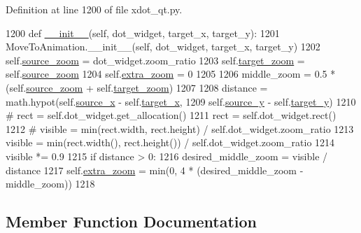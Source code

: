 Definition at line 1200 of file xdot\+\_\+qt.\+py.


\begin{DoxyCode}
1200     \textcolor{keyword}{def }\hyperlink{classsmacc__viewer_1_1xdot_1_1xdot__qt_1_1ZoomToAnimation_a29cad6d4a0c70d2abe0f7b8d5db36249}{\_\_init\_\_}(self, dot\_widget, target\_x, target\_y):
1201         MoveToAnimation.\_\_init\_\_(self, dot\_widget, target\_x, target\_y)
1202         self.\hyperlink{classsmacc__viewer_1_1xdot_1_1xdot__qt_1_1ZoomToAnimation_aedf5392aa82941dcec7f70af9c3a0fcc}{source\_zoom} = dot\_widget.zoom\_ratio
1203         self.\hyperlink{classsmacc__viewer_1_1xdot_1_1xdot__qt_1_1ZoomToAnimation_ade4c136c38f4c369d08f7f501482bdc1}{target\_zoom} = self.\hyperlink{classsmacc__viewer_1_1xdot_1_1xdot__qt_1_1ZoomToAnimation_aedf5392aa82941dcec7f70af9c3a0fcc}{source\_zoom}
1204         self.\hyperlink{classsmacc__viewer_1_1xdot_1_1xdot__qt_1_1ZoomToAnimation_a66b4693cd4ce88c2f2b75d00132abd2d}{extra\_zoom} = 0
1205 
1206         middle\_zoom = 0.5 * (self.\hyperlink{classsmacc__viewer_1_1xdot_1_1xdot__qt_1_1ZoomToAnimation_aedf5392aa82941dcec7f70af9c3a0fcc}{source\_zoom} + self.\hyperlink{classsmacc__viewer_1_1xdot_1_1xdot__qt_1_1ZoomToAnimation_ade4c136c38f4c369d08f7f501482bdc1}{target\_zoom})
1207 
1208         distance = math.hypot(self.\hyperlink{classsmacc__viewer_1_1xdot_1_1xdot__qt_1_1MoveToAnimation_a663031c3ed4dda5b36e80d8538fb5639}{source\_x} - self.\hyperlink{classsmacc__viewer_1_1xdot_1_1xdot__qt_1_1MoveToAnimation_a7a7a24555d78e358db021b1685d35916}{target\_x},
1209                               self.\hyperlink{classsmacc__viewer_1_1xdot_1_1xdot__qt_1_1MoveToAnimation_a2f112551579377e84006d0fa11502e45}{source\_y} - self.\hyperlink{classsmacc__viewer_1_1xdot_1_1xdot__qt_1_1MoveToAnimation_adf69b91918027d26503debdd035b822c}{target\_y})
1210 \textcolor{comment}{#        rect = self.dot\_widget.get\_allocation()}
1211         rect = self.dot\_widget.rect()
1212 \textcolor{comment}{#        visible = min(rect.width, rect.height) / self.dot\_widget.zoom\_ratio}
1213         visible = min(rect.width(), rect.height()) / self.dot\_widget.zoom\_ratio
1214         visible *= 0.9
1215         \textcolor{keywordflow}{if} distance > 0:
1216             desired\_middle\_zoom = visible / distance
1217             self.\hyperlink{classsmacc__viewer_1_1xdot_1_1xdot__qt_1_1ZoomToAnimation_a66b4693cd4ce88c2f2b75d00132abd2d}{extra\_zoom} = min(0, 4 * (desired\_middle\_zoom - middle\_zoom))
1218 
\end{DoxyCode}


\subsection{Member Function Documentation}
